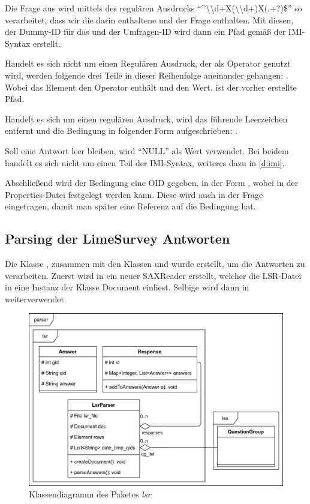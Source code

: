 Die Frage aus  wird mittels des regulären Ausdrucks \enquote{\textasciicircum\textbackslash\textbackslash d+X(\textbackslash\textbackslash d+)X(.+?)\$} so verarbeitet, dass wir die darin enthaltene  und  der Frage enthalten.
Mit diesen, der Dummy-ID für das  und der Umfragen-ID wird dann ein Pfad gemäß der IMI-Syntax erstellt.

Handelt es sich nicht um einen Regulären Ausdruck, der als Operator genutzt wird, werden folgende drei Teile in dieser Reihenfolge aneinander gehangen: .
Wobei das Element  den Operator enthält und  den Wert.  ist der vorher erstellte Pfad.

Handelt es sich um einen regulären Ausdruck, wird das führende Leerzeichen entfernt und die Bedingung in folgender Form aufgeschrieben: .

Soll eine Antwort leer bleiben, wird \enquote{NULL} als Wert verwendet.
Bei beidem handelt es sich nicht um einen Teil der IMI-Syntax, weiteres dazu in \cref{d:imi}.

Abschließend wird der Bedingung eine OID gegeben, in der Form , wobei  in der Properties-Datei festgelegt werden kann.
Diese wird auch in der Frage eingetragen, damit man später eine Referenz auf die Bedingung hat.

\subsection{Parsing der LimeSurvey Antworten}
\label{im:ans}

Die Klasse , zusammen mit den Klassen  und  wurde erstellt, um die Antworten zu verarbeiten.
Zuerst wird in  ein neuer SAXReader erstellt, welcher die LSR-Datei in eine Instanz der Klasse Document einliest.
Selbige wird dann in  weiterverwendet.

\begin{figure}[h]
			\centering
			\includegraphics[width=.98\textwidth]{./img/cls_lsr.png}
			\caption{Klassendiagramm des Paketes \textit{lsr}}
\end{figure}


